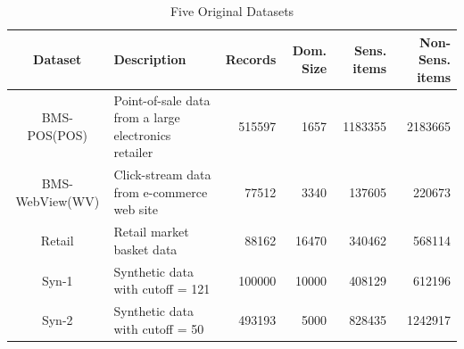 \begin{table}[th]
\caption{Five Original Datasets}
\centering
\begin{tabular}{|c|l|r|r|r|r|} \hline
Dataset	& Description & Records & Dom. Size & Sens. items & Non-Sens. items  \\ \hline \hline
BMS-POS(POS) &Point-of-sale data from a large electronics retailer    &515597 & 1657&1183355 &  2183665\\ \hline
BMS-WebView(WV) &Click-stream data from e-commerce web site  &77512 & 3340& 137605 & 220673  \\ \hline
Retail &  Retail market basket data   & 88162&16470 &340462 & 568114  \\ \hline
Syn-1 & Synthetic data with cutoff = 121   & 100000& 10000& 408129&  612196 \\ \hline
Syn-2 & Synthetic data with cutoff = 50   & 493193 &5000 &828435 & 1242917 \\ \hline
\end{tabular}
\label{tab:datasets}
\end{table}

